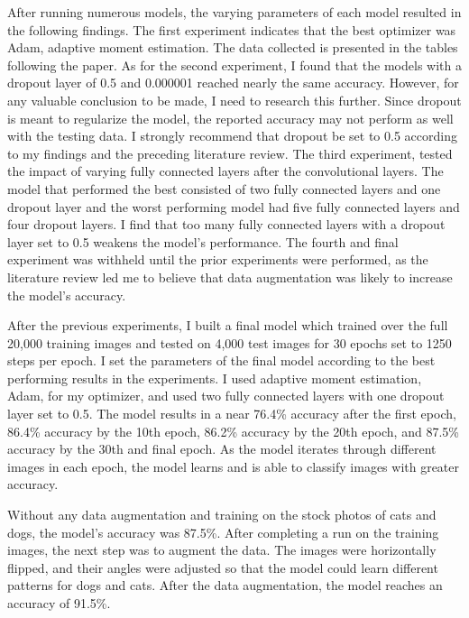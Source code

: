 \documentclass[12pt,english]{article}
\begin{document}
After running numerous models, the varying parameters of each model resulted in the following findings. The first experiment indicates that the best optimizer was Adam, adaptive moment estimation. The data collected is presented in the tables following the paper. As for the second experiment, I found that the models with a dropout layer of 0.5 and 0.000001 reached nearly the same accuracy. However, for any valuable conclusion to be made, I need to research this further. Since dropout is meant to regularize the model, the reported accuracy may not perform as well with the testing data. I strongly recommend that dropout be set to 0.5 according to my findings and the preceding literature review. The third experiment, tested the impact of varying fully connected layers after the convolutional layers. The model that performed the best consisted of two fully connected layers and one dropout layer and the worst performing model had five fully connected layers and four dropout layers. I find that too many fully connected layers with a dropout layer set to 0.5 weakens the model’s performance. The fourth and final experiment was withheld until the prior experiments were performed, as the literature review led me to believe that data augmentation was likely to increase the model’s accuracy. \par

After the previous experiments, I built a final model which trained over the full 20,000 training images and tested on 4,000 test images for 30 epochs set to 1250 steps per epoch. I set the parameters of the final model according to the best performing results in the experiments. I used adaptive moment estimation, Adam, for my optimizer, and used two fully connected layers with one dropout layer set to 0.5. The model results in a near 76.4\% accuracy after the first epoch, 86.4\% accuracy by the 10th epoch, 86.2\% accuracy by the 20th epoch, and 87.5\% accuracy by the 30th and final epoch. As the model iterates through different images in each epoch, the model learns and is able to classify images with greater accuracy. \par

Without any data augmentation and training on the stock photos of cats and dogs, the model’s accuracy was 87.5\%. After completing a run on the training images, the next step was to augment the data. The images were horizontally flipped, and their angles were adjusted so that the model could learn different patterns for dogs and cats. After the data augmentation, the model reaches an accuracy of 91.5\%.\par
\end{document}
